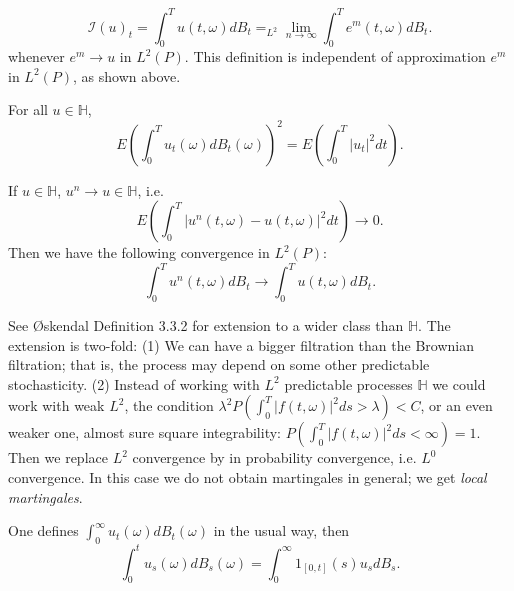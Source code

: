 \begin{definition}
	\[
		\mathcal{I}(u)_t = \int _0^T u(t, \omega) d B_t
		=_{L^2} \lim_{n \to \infty} \int _0^T e^m(t, \omega) d B_t
	.\] 
	whenever $e^m \to  u$ in $L^2(P)$.
		This definition is independent of approximation $e^m$ in $L^2(P)$, as shown above.
\end{definition}
\begin{corollary}
	For all $u \in \mathbb{H}$,
	\[
		E\left( \int _0^T u_t(\omega) d B_t(\omega) \right) ^2
	= E\left( \int _0^T |u_t|^2 d t \right) 
	.\] 
\end{corollary}

\begin{corollary}
	If $u \in \mathbb{H}$, $u^n \to  u \in \mathbb{H}$, i.e.
	\[
		E \left( \int _0^T \left| u^n(t, \omega) - u(t, \omega) \right| ^2 d t \right)  \to  0
	.\] 
	Then we have the following convergence in $L^2(P)$:
	 \[
		\int _0^T u^n(t, \omega) dB_t \to \int _0^T u(t, \omega) d B_t
	.\] 
\end{corollary}

\begin{remark}
	See Øskendal Definition 3.3.2 for extension to a wider class than $\mathbb{H}$. The extension is two-fold: (1) We can have a bigger filtration than the Brownian filtration; that is, the process may depend on some other predictable stochasticity. (2) Instead of working with $L^2$ predictable processes $\mathbb{H}$ we could work with weak $L^2$, the condition
	$\lambda^2 P(\int_0^T |f(t, \omega)|^2 d s > \lambda) < C$, or an even weaker one, almost sure square integrability: $P(\int_0^T |f(t, \omega)|^2 d s < \infty) =1 $. Then we replace $L^2$ convergence by in probability convergence, i.e. $L^0$ convergence. In this case we do not obtain martingales in general; we get \textit{local martingales}.
\end{remark}

\begin{remark}
	One defines $\int _0^\infty  u_t(\omega) d B_t (\omega)$ in the usual way, then
	\[
		\int _0^t u_s(\omega) dB_s(\omega)
		= \int _0^\infty 1_{[0, t]}(s) u_s d B_s
	.\] 
\end{remark}

